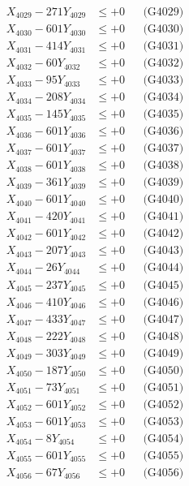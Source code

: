 \documentclass[a4paper,10pt]{article}
\begin{document}
{\begin{align}
X_{4029} - 271Y_{4029} &\leq +0 && \text{(G4029)} \\
X_{4030} - 601Y_{4030} &\leq +0 && \text{(G4030)} \\
\allowbreak
X_{4031} - 414Y_{4031} &\leq +0 && \text{(G4031)} \\
X_{4032} - 60Y_{4032} &\leq +0 && \text{(G4032)} \\
X_{4033} - 95Y_{4033} &\leq +0 && \text{(G4033)} \\
X_{4034} - 208Y_{4034} &\leq +0 && \text{(G4034)} \\
X_{4035} - 145Y_{4035} &\leq +0 && \text{(G4035)} \\
X_{4036} - 601Y_{4036} &\leq +0 && \text{(G4036)} \\
X_{4037} - 601Y_{4037} &\leq +0 && \text{(G4037)} \\
X_{4038} - 601Y_{4038} &\leq +0 && \text{(G4038)} \\
X_{4039} - 361Y_{4039} &\leq +0 && \text{(G4039)} \\
X_{4040} - 601Y_{4040} &\leq +0 && \text{(G4040)} \\
\allowbreak
X_{4041} - 420Y_{4041} &\leq +0 && \text{(G4041)} \\
X_{4042} - 601Y_{4042} &\leq +0 && \text{(G4042)} \\
X_{4043} - 207Y_{4043} &\leq +0 && \text{(G4043)} \\
X_{4044} - 26Y_{4044} &\leq +0 && \text{(G4044)} \\
X_{4045} - 237Y_{4045} &\leq +0 && \text{(G4045)} \\
X_{4046} - 410Y_{4046} &\leq +0 && \text{(G4046)} \\
X_{4047} - 433Y_{4047} &\leq +0 && \text{(G4047)} \\
X_{4048} - 222Y_{4048} &\leq +0 && \text{(G4048)} \\
X_{4049} - 303Y_{4049} &\leq +0 && \text{(G4049)} \\
X_{4050} - 187Y_{4050} &\leq +0 && \text{(G4050)} \\
\allowbreak
X_{4051} - 73Y_{4051} &\leq +0 && \text{(G4051)} \\
X_{4052} - 601Y_{4052} &\leq +0 && \text{(G4052)} \\
X_{4053} - 601Y_{4053} &\leq +0 && \text{(G4053)} \\
X_{4054} - 8Y_{4054} &\leq +0 && \text{(G4054)} \\
X_{4055} - 601Y_{4055} &\leq +0 && \text{(G4055)} \\
X_{4056} - 67Y_{4056} &\leq +0 && \text{(G4056)} \\

\end{align}}
\end{document}
